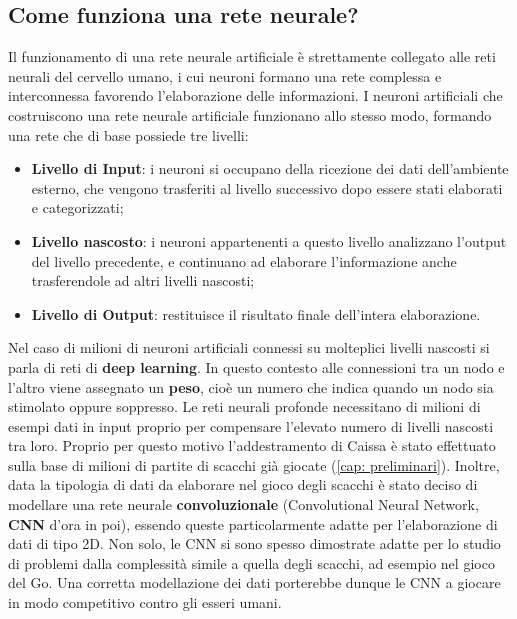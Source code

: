 \subsection{Come funziona una rete neurale?}
Il funzionamento di una rete neurale artificiale è strettamente collegato alle reti neurali del cervello umano, i cui neuroni formano una rete complessa e interconnessa favorendo l'elaborazione delle informazioni. I neuroni artificiali che costruiscono una rete neurale artificiale funzionano allo stesso modo, formando una rete che di base possiede tre livelli:
\begin{itemize}
    \item \textbf{Livello di Input}: i neuroni si occupano della ricezione dei dati dell'ambiente esterno, che vengono trasferiti al livello successivo dopo essere stati elaborati e categorizzati;
    \item \textbf{Livello nascosto}: i neuroni appartenenti a questo livello analizzano l'output del livello precedente, e continuano ad elaborare l'informazione anche trasferendole ad altri livelli nascosti;
    \item \textbf{Livello di Output}: restituisce il risultato finale dell'intera elaborazione.
\end{itemize}
Nel caso di milioni di neuroni artificiali connessi su molteplici livelli nascosti si parla di reti di \textbf{deep learning}. In questo contesto alle connessioni tra un nodo e l'altro viene assegnato un \textbf{peso}, cioè un numero che indica quando un nodo sia stimolato oppure soppresso. Le reti neurali profonde necessitano di milioni di esempi dati in input proprio per compensare l'elevato numero di livelli nascosti tra loro. Proprio per questo motivo l'addestramento di Caissa è stato effettuato sulla base di milioni di partite di scacchi già giocate (\ref{cap: preliminari}).
Inoltre, data la tipologia di dati da elaborare nel gioco degli scacchi è stato deciso di modellare una rete neurale \textbf{convoluzionale} (Convolutional Neural Network, \textbf{CNN} d'ora in poi), essendo queste particolarmente adatte per l'elaborazione di dati di tipo 2D. Non solo, le CNN si sono spesso dimostrate adatte per lo studio di problemi dalla complessità simile a quella degli scacchi, ad esempio nel gioco del Go\cite{clark2015training}. Una corretta modellazione dei dati porterebbe dunque le CNN a giocare in modo competitivo contro gli esseri umani.

